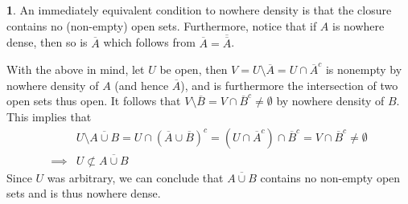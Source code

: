 \documentclass[10.5pt]{article}
\theoremstyle{definition}
\newtheorem{pb}{}
\begin{document}
    \begin{pb}
        An immediately equivalent condition to nowhere density is that the closure contains no (non-empty) open sets. Furthermore, notice that if \(A\) is nowhere dense, then so is \(\overline{A}\) which follows from \(\overline{A} = \overline{\overline{A}}\).

        With the above in mind, let \(U\) be open, then \(V = U \setminus \overline{A} = U \cap \overline{A}^c\) is nonempty by nowhere density of \(A\) (and hence \(\overline{A}\)), and is furthermore the intersection of two open sets thus open. It follows that \(V \setminus \overline{B} = V \cap \overline{B}^c \neq \emptyset\) by nowhere density of \(B\). This implies that
        \begin{align*}
            &U \setminus \overline{A\cup B} = U \cap (\overline{A}\cup \overline{B})^c = (U \cap \overline{A}^c) \cap \overline{B}^c = V \cap \overline{B}^c \neq \emptyset \\
            \implies &U \not \subset \overline{A\cup B}
        \end{align*}
        Since \(U\) was arbitrary, we can conclude that \(\overline{A\cup B}\) contains no non-empty open sets and is thus nowhere dense.
    \end{pb}
\end{document}
